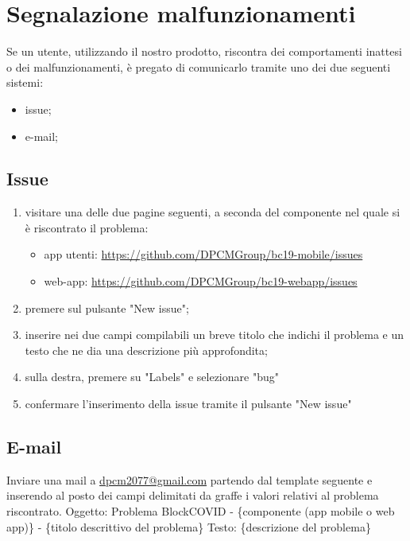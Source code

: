 \section{Segnalazione malfunzionamenti}
Se un utente, utilizzando il nostro prodotto, riscontra dei comportamenti inattesi o dei malfunzionamenti, è pregato di comunicarlo tramite uno dei due seguenti sistemi:
\begin{itemize}
	\item issue;
	\item e-mail;
\end{itemize}
\subsection{Issue}
\begin{enumerate}
	\item visitare una delle due pagine seguenti, a seconda del componente nel quale si è riscontrato il problema:
	\begin{itemize}
		\item app utenti: \url{https://github.com/DPCMGroup/bc19-mobile/issues}
		\item web-app: \url{https://github.com/DPCMGroup/bc19-webapp/issues}
	\end{itemize}
	\item premere sul pulsante "New issue";
	\item inserire nei due campi compilabili un breve titolo che indichi il problema e un testo che ne dia una descrizione più approfondita;
	\item sulla destra, premere su "Labels" e selezionare "bug"
	\item confermare l'inserimento della issue tramite il pulsante "New issue"
\end{enumerate}
\subsection{E-mail}
Inviare una mail a \href{mailto:dpcm2077@gmail.com}{dpcm2077@gmail.com} partendo dal template seguente e inserendo al posto dei campi delimitati da graffe i valori relativi al problema riscontrato. \newline
Oggetto: \newline
Problema BlockCOVID - \{componente (app mobile o web app)\} - \{titolo descrittivo del problema\} \newline
Testo: \newline
\{descrizione del problema\} \newline